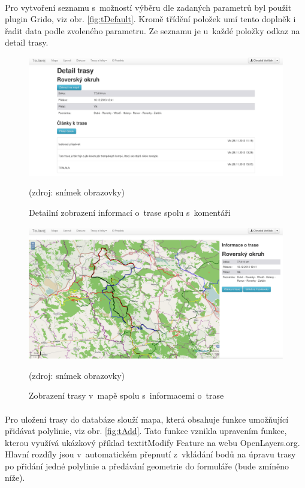 \documentclass[11pt,a4paper,titlepage,oneside]{book}
\begin{document}
		\paragraph{} Pro vytvoření seznamu s~možností výběru dle zadaných parametrů byl použit plugin Grido, viz obr. \ref{fig:tDefault}. Kromě třídění položek umí tento doplněk i řadit data podle zvoleného parametru. Ze seznamu je u~každé položky odkaz na detail trasy.
		\begin{figure}[!h]
			\begin{center}
				\includegraphics[width=12cm]{obrazky/toulavej/trackDetail.png}
				\caption{Detailní zobrazení informací o~trase spolu s~komentáři}
				\label{fig:tDetail}
				(zdroj: snímek obrazovky)
			\end{center}
		\end{figure}
		\begin{figure}[!h]
			\begin{center}
				\includegraphics[width=12cm]{obrazky/toulavej/trackTrack.png}
				\caption{Zobrazení trasy v~mapě spolu s~informacemi o~trase}
				\label{fig:tTrack}
				(zdroj: snímek obrazovky)
			\end{center}
		\end{figure}
			\paragraph{} Pro uložení trasy do databáze slouží mapa, která obsahuje funkce umožňující přidávat polylinie, viz obr. \ref{fig:tAdd}. Tato funkce vznikla upravením funkce, kterou využívá ukázkový příklad textit{Modify Feature} na webu OpenLayers.org\cite{ol}. Hlavní rozdíly jsou v~automatickém přepnutí z~vkládání bodů na úpravu trasy po přidání jedné polylinie a předávání geometrie do formuláře (bude zmíněno níže).
\end{document}
